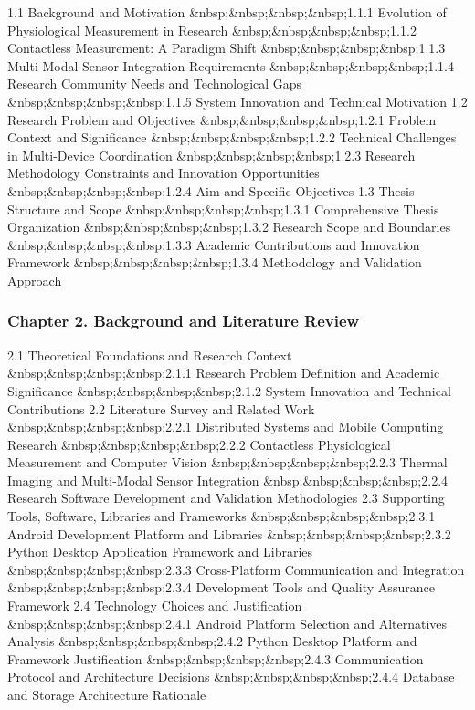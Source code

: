 \documentclass[12pt,a4paper]{report}
\begin{document}
1.1 Background and Motivation  
\&nbsp;\&nbsp;\&nbsp;\&nbsp;1.1.1 Evolution of Physiological Measurement in Research  
\&nbsp;\&nbsp;\&nbsp;\&nbsp;1.1.2 Contactless Measurement: A Paradigm Shift  
\&nbsp;\&nbsp;\&nbsp;\&nbsp;1.1.3 Multi-Modal Sensor Integration Requirements  
\&nbsp;\&nbsp;\&nbsp;\&nbsp;1.1.4 Research Community Needs and Technological Gaps  
\&nbsp;\&nbsp;\&nbsp;\&nbsp;1.1.5 System Innovation and Technical Motivation  
1.2 Research Problem and Objectives  
\&nbsp;\&nbsp;\&nbsp;\&nbsp;1.2.1 Problem Context and Significance  
\&nbsp;\&nbsp;\&nbsp;\&nbsp;1.2.2 Technical Challenges in Multi-Device Coordination  
\&nbsp;\&nbsp;\&nbsp;\&nbsp;1.2.3 Research Methodology Constraints and Innovation Opportunities  
\&nbsp;\&nbsp;\&nbsp;\&nbsp;1.2.4 Aim and Specific Objectives  
1.3 Thesis Structure and Scope  
\&nbsp;\&nbsp;\&nbsp;\&nbsp;1.3.1 Comprehensive Thesis Organization  
\&nbsp;\&nbsp;\&nbsp;\&nbsp;1.3.2 Research Scope and Boundaries  
\&nbsp;\&nbsp;\&nbsp;\&nbsp;1.3.3 Academic Contributions and Innovation Framework  
\&nbsp;\&nbsp;\&nbsp;\&nbsp;1.3.4 Methodology and Validation Approach

\subsubsection{Chapter 2. Background and Literature Review}

2.1 Theoretical Foundations and Research Context  
\&nbsp;\&nbsp;\&nbsp;\&nbsp;2.1.1 Research Problem Definition and Academic Significance  
\&nbsp;\&nbsp;\&nbsp;\&nbsp;2.1.2 System Innovation and Technical Contributions  
2.2 Literature Survey and Related Work  
\&nbsp;\&nbsp;\&nbsp;\&nbsp;2.2.1 Distributed Systems and Mobile Computing Research  
\&nbsp;\&nbsp;\&nbsp;\&nbsp;2.2.2 Contactless Physiological Measurement and Computer Vision  
\&nbsp;\&nbsp;\&nbsp;\&nbsp;2.2.3 Thermal Imaging and Multi-Modal Sensor Integration  
\&nbsp;\&nbsp;\&nbsp;\&nbsp;2.2.4 Research Software Development and Validation Methodologies  
2.3 Supporting Tools, Software, Libraries and Frameworks  
\&nbsp;\&nbsp;\&nbsp;\&nbsp;2.3.1 Android Development Platform and Libraries  
\&nbsp;\&nbsp;\&nbsp;\&nbsp;2.3.2 Python Desktop Application Framework and Libraries  
\&nbsp;\&nbsp;\&nbsp;\&nbsp;2.3.3 Cross-Platform Communication and Integration  
\&nbsp;\&nbsp;\&nbsp;\&nbsp;2.3.4 Development Tools and Quality Assurance Framework  
2.4 Technology Choices and Justification  
\&nbsp;\&nbsp;\&nbsp;\&nbsp;2.4.1 Android Platform Selection and Alternatives Analysis  
\&nbsp;\&nbsp;\&nbsp;\&nbsp;2.4.2 Python Desktop Platform and Framework Justification  
\&nbsp;\&nbsp;\&nbsp;\&nbsp;2.4.3 Communication Protocol and Architecture Decisions  
\&nbsp;\&nbsp;\&nbsp;\&nbsp;2.4.4 Database and Storage Architecture Rationale
\end{document}
